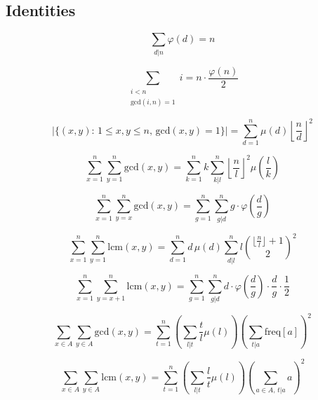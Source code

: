 \subsection{Identities}

\[ \sum_{d|n} \varphi(d) = n\]

\[ \sum_{\substack{i < n \\ \text{gcd}(i, n) = 1}} i = n \cdot \frac{\varphi(n)}{2} \]

\[ |\{(x, y) : \, 1 \leq x, y \leq n, \, \text{gcd}(x, y) = 1\}| = \sum_{d = 1}^n \mu(d) \left \lfloor \frac{n}{d} \right \rfloor^2\]

\[\sum_{x = 1}^n \sum_{y = 1}^n \text{gcd}(x, y)
= \sum_{k = 1}^n k \sum_{k|l}^{n} \left \lfloor \frac{n}{l} \right \rfloor^2 \mu\left(\frac{l}{k}\right)\]

\[\sum_{x = 1}^n \sum_{y = x}^n \text{gcd}(x, y) = \sum_{g = 1}^n \sum_{g|d}^n g \cdot \varphi\left(\frac{d}{g}\right)\]

\[\sum_{x = 1}^n \sum_{y = 1}^n \text{lcm}(x, y)
= \sum_{d = 1}^n d \, \mu(d) \sum_{d|l}^{n} l \binom{\lfloor \frac{n}{l} \rfloor + 1}{2}^2\]

\[\sum_{x = 1}^n \sum_{y = x+1}^n \text{lcm}(x, y) = \sum_{g = 1}^n \sum_{g|d}^n d \cdot \varphi\left(\frac{d}{g}\right) \cdot \frac{d}{g} \cdot \frac 1 2\]

\[\sum_{x \in A} \sum_{y \in A} \text{gcd}(x, y)
= \sum_{t = 1}^n \left(\sum_{l | t} \frac{t}{l} \mu(l)\right) \left(\sum_{t|a} \text{freq}[a]\right)^2\]

\[\sum_{x \in A} \sum_{y \in A} \text{lcm}(x, y)
= \sum_{t = 1}^n \left(\sum_{l | t} \frac{l}{t} \mu(l)\right) \left(\sum_{a \in A, \, t|a} a\right)^2\]
